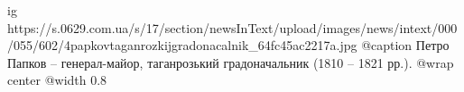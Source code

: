  
 
 
 
 

\ifcmt
  ig https://s.0629.com.ua/s/17/section/newsInText/upload/images/news/intext/000/055/602/4papkovtaganrozkijgradonacalnik_64fc45ac2217a.jpg
	@caption Петро Папков – генерал-майор, таганрозький градоначальник (1810 – 1821 рр.).
  @wrap center
  @width 0.8
\fi
